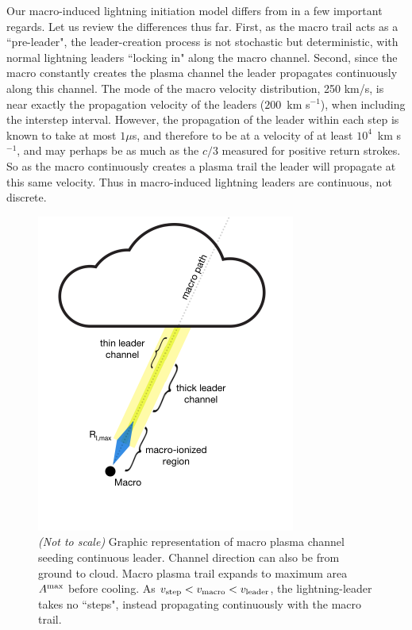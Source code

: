 \documentclass[%
 reprint,
 amsmath,amssymb,
 aps,
]{revtex4-2}
\begin{document}
        Our macro-induced lightning initiation model differs from \citet{DwyerUman2014} in a few important regards. Let us review the differences thus far. First, as the macro trail acts as a ``pre-leader", the leader-creation process is not stochastic but deterministic, with normal lightning leaders ``locking in" along the macro channel. Second, since the macro constantly creates the plasma channel the leader propagates continuously along this channel. The mode of the macro velocity distribution, 250 km/s, is near exactly the propagation velocity of the leaders ($200\,$ km s$^{-1}$), when including the interstep interval. However, the propagation of the leader within each step is known to take at most $1\mu$s, and therefore to be at a velocity of at least $10^4\,$ km s$^{-1}$, and may perhaps be as much as the $c/3$ measured for positive return strokes. So as the macro continuously creates a plasma trail the leader will propagate at this same velocity. Thus in macro-induced lightning leaders are continuous, not discrete.

        \begin{figure}[ht]
            \centering
            \includegraphics[width=\linewidth]{macro_schematic.pdf}
            \caption{\textit{(Not to scale)} Graphic representation of macro plasma channel seeding continuous leader. Channel direction can also be from ground to cloud. Macro plasma trail expands to maximum area $A^{\rm{max}}$ before cooling. As $v_{\rm{step}} < v_{\rm{macro}} < v_{\rm{leader}}$, the lightning-leader takes no ``steps", instead propagating continuously with the macro trail.}
            \label{fig:macro_graphic}
        \end{figure}
\end{document}
